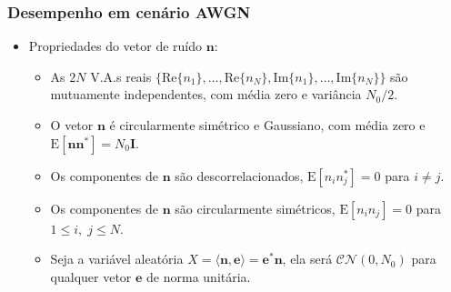 \begin{frame}
	\frametitle{Desempenho em cenário AWGN}

	\begin{itemize}
	    \item Propriedades do vetor de ruído $\mathbf{n}$:
	    \begin{itemize}
		\item As $2N$ V.A.s reais $\{\mathrm{Re}\{n_1\},\ldots,\mathrm{Re}\{n_N\},\mathrm{Im}\{n_1\},\ldots,\mathrm{Im}\{n_N\} \}$ são mutuamente independentes, com média zero e variância $N_0/2$.
		\item O vetor $\mathbf{n}$ é circularmente simétrico e Gaussiano, com média zero e $\mathrm{E}[\mathbf{nn}^*] = N_0 \mathbf{I}$.
		\item Os componentes de $\mathbf{n}$ são descorrelacionados, $\mathrm{E}[n_in_j^*]=0$ para $i\neq j$.
		\item Os componentes de $\mathbf{n}$ são circularmente simétricos, $\mathrm{E}[n_in_j]=0$ para $1 \leq i, \; j\leq N$.
		\item Seja a variável aleatória $X = \langle \mathbf{n}, \mathbf{e} \rangle = \mathbf{e}^* \mathbf{n}$, ela será $\mathcal{CN}(0,N_0)$ para qualquer vetor $\mathbf{e}$ de norma unitária.
	    \end{itemize}
	\end{itemize}
\end{frame}

